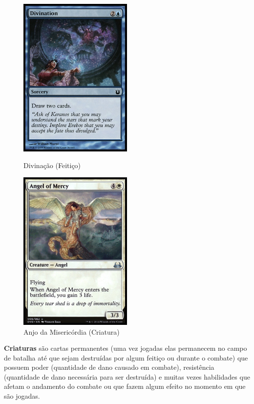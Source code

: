 \documentclass[dvipsnames]{book}
\begin{document}
\begin{figure}[!h]
    \centering
    \begin{minipage}{0.45\textwidth}
        \centering
        \includegraphics[width=0.5\textwidth]{picstcc/divination.jpg}
        \caption{Divinação (Feitiço)}
        \label{divination}
    \end{minipage}\hfill
    \begin{minipage}{0.45\textwidth}
        \centering
        \includegraphics[width=0.5\textwidth]{picstcc/angelOfMercy.jpg}
        \caption{Anjo da Misericórdia (Criatura)}
        \label{anjo}
    \end{minipage}
\end{figure}

\textbf{Criaturas} são cartas permanentes (uma vez jogadas elas
permanecem no campo de batalha até que sejam destruídas por algum
feitiço ou durante o combate) que possuem poder (quantidade de dano
causado em combate), resistência (quantidade de dano necessária para ser
destruída) e muitas vezes habilidades que afetam o andamento do combate
ou que fazem algum efeito no momento em que são jogadas.
\end{document}

